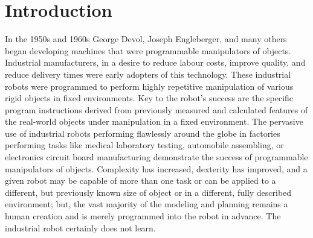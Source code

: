 \chapter{Introduction}


In the 1950s and 1960s George Devol, Joseph Engleberger, and many others began developing machines that were programmable manipulators of objects. Industrial manufacturers, in a desire to reduce labour costs, improve quality, and reduce delivery times were early adopters of this technology. These industrial robots were programmed to perform highly repetitive manipulation of various rigid objects in fixed environments. Key to the robot’s success are the specific program instructions derived from previously measured and calculated features of the real-world objects under manipulation in a fixed environment. The pervasive use of industrial robots performing flawlessly around the globe in factories performing tasks like medical laboratory testing, automobile assembling, or electronics circuit board manufacturing demonstrate the success of programmable manipulators of objects. Complexity has increased, dexterity has improved, and a given robot may be capable of more than one task or can be applied to a different, but previously known size of object or in a different, fully described environment; but, the vast majority of the modeling and planning remains a human creation and is merely programmed into the robot in advance. The industrial robot certainly does not learn.

